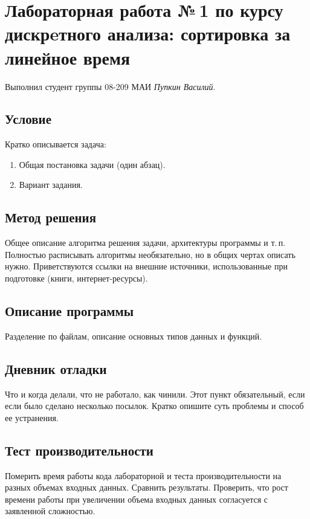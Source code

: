 \documentclass[12pt]{article}
\begin{document}
\section*{Лабораторная работа №\,1 по курсу дискрeтного анализа: сортировка за линейное время}

Выполнил студент группы 08-209 МАИ \textit{Пупкин Василий}.

\subsection*{Условие}

Кратко описывается задача: 
\begin{enumerate}
\item Общая постановка задачи (один абзац).
\item Вариант задания. 
\end{enumerate}

\subsection*{Метод решения}

Общее описание алгоритма решения задачи, архитектуры программы и
т.\,п. Полностью расписывать алгоритмы необязательно, но в общих чертах
описать нужно. Приветствуются ссылки на внешние источники,
использованные при подготовке (книги, интернет-ресурсы). 

\subsection*{Описание программы}

Разделение по файлам, описание основных типов данных и функций. 

\subsection*{Дневник отладки}

Что и когда делали, что не работало, как чинили.
Этот пункт обязательный, если если было сделано несколько
посылок. Кратко опишите суть проблемы и способ ее устранения.

\subsection*{Тест производительности}

Померить время работы кода лабораторной и теста производительности
на разных объемах входных данных. Сравнить результаты. Проверить,
что рост времени работы при увеличении объема входных данных
согласуется с заявленной сложностью.
\end{document}
